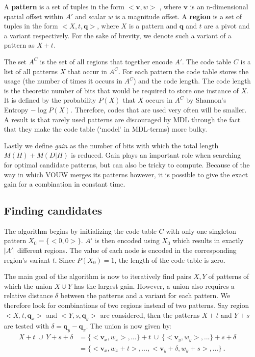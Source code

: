 \documentclass{llncs}
\begin{document}
A \textbf{pattern} is a set of tuples in the form $<\mathbf{v},w>$ , where $\mathbf{v}$ is an n-dimensional spatial offset within $A'$ and scalar $w$ is a magnitude offset.
A \textbf{region} is a set of tuples in the form $<X,t,\mathbf{q}>$, where $X$ is a pattern and $\mathbf{q}$ and $t$ are a pivot and a variant respectively. For the sake of brevity, we denote such a variant of a pattern as $X+t$. 

The set $A^{C}$ is the set of all regions that together encode $A'$.
The code table $C$ is a list of all patterns $X$ that occur in $A^C$. For each pattern the code table stores the usage (the number of times it occurs in $A^{C}$) and the code length. The code length is the theoretic number of bits that would be required to store one instance of $X$. It is defined by the probability $P(X)$ that $X$ occurs in $A^{C}$ by Shannon's Entropy\cite{shannon} $-\log P(X)$. Therefore, codes that are used very often will be smaller. A result is that rarely used patterns are discouraged by MDL through the fact that they make the code table (`model' in MDL-terms) more bulky.

Lastly we define \emph{gain} as the number of bits with which the total length $M(H)+M(D|H)$ is reduced. Gain plays an important role when searching for optimal candidate patterns, but can also be tricky to compute. Because of the way in which VOUW merges its patterns however, it is possible to give the exact gain for a combination in constant time.

\subsection{Finding candidates}
The algorithm begins by initializing the code table $C$ with only one singleton pattern $X_0=\{<0,0>\}$. $A'$ is then encoded using $X_0$ which results in exactly $|A'|$ different regions. The value of each node is encoded in the corresponding region's variant $t$. Since $P(X_0)=1$, the length of the code table is zero. 

The main goal of the algorithm is now to iteratively find pairs $X,Y$ of patterns of which the union $X \cup Y$ has the largest gain. However, a union also requires a relative distance $\delta$ between the patterns and a variant for each pattern. We therefore look for combinations of two regions instead of two patterns. Say region $<X,t,\mathbf{q}_x>$ and $<Y,s, \mathbf{q}_y>$ are considered, then the patterns $X+t$ and $Y+s$ are tested with $\delta = \mathbf{q}_y - \mathbf{q}_x$. The union is now given by:
\begin{align*}
X+t \ \cup \  Y+s+\delta &= \{<\mathbf{v}_x,w_x>,...\}+t \ \cup \  \{<\mathbf{v}_y,w_y>,...\} +s+\delta \\
 &= \{<\mathbf{v}_x,w_x+t>,...,<\mathbf{v}_y+\delta,w_y+s>,...\}\ .
\end{align*}
\end{document}
